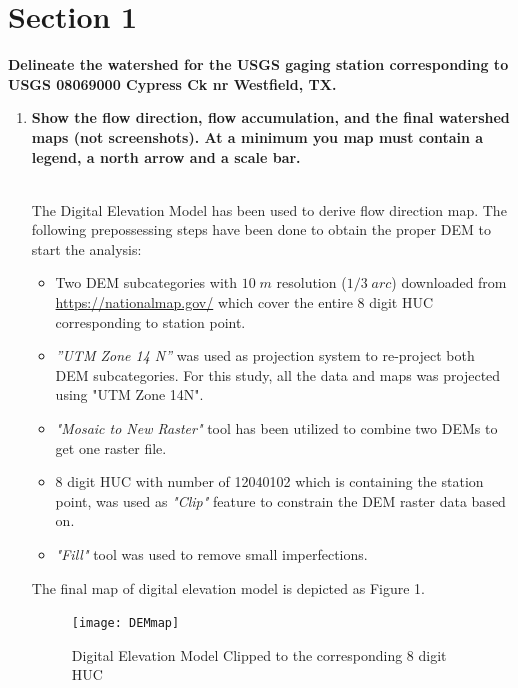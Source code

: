 \documentclass[letterpaper,12pt]{article}
\begin{document}
\tableofcontents
\newpage
\listoffigures
\newpage
\listoftables
\pagebreak



\section*{Section 1}
\textbf{Delineate the watershed for the USGS gaging station corresponding to USGS 08069000 Cypress Ck nr Westfield, TX.}
\\
\begin{enumerate}
	\item \textbf{Show the flow direction, flow accumulation, and the final watershed maps (not screenshots). At a minimum you map must contain a legend, a north arrow and a scale bar.}\\~
	
	The Digital Elevation Model has been used to derive flow direction map. The following prepossessing steps have been done to obtain the proper DEM to start the analysis:
\begin{itemize}
	\item Two DEM subcategories with $10\;m$ resolution ($1/3\;arc$) downloaded from \url{https://nationalmap.gov/} which cover the entire 8 digit HUC corresponding to station point.
	\item \emph{''UTM Zone 14 N''} was used as projection system to re-project both DEM subcategories. For this study, all the data and maps was projected using "UTM Zone 14N".
	\item \emph{"Mosaic to New Raster"} tool has been utilized to combine two DEMs to get one raster file.
	\item 8 digit HUC with number of 12040102 which is containing the station point, was used as \emph{"Clip"} feature to constrain the DEM raster data based on.
	\item \emph{"Fill"} tool was used to remove small imperfections.
\end{itemize}
		The final map of digital elevation model is depicted as Figure 1.
	\begin{figure}[H]
		\begin{center}
			\texttt{[image: DEMmap]}
		\end{center}
		\caption{Digital Elevation Model Clipped to the corresponding 8 digit HUC}\label{DEM}
	\end{figure}
	

\end{enumerate}
\end{document}
